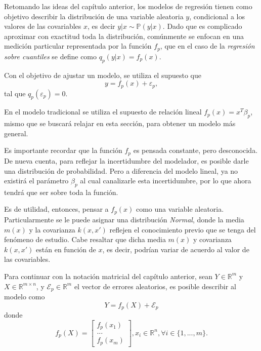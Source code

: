 Retomando las ideas del cap\'itulo anterior, los modelos de regresi\'on tienen como objetivo describir la distribuci\'on de una variable aleatoria $y$, condicional a los valores de las covariables $x$, es decir $y|x \sim \mathbb{P}(y|x)$. Dado que es complicado aproximar con exactitud toda la distribuci\'on, com\'unmente se enfocan en una medici\'on particular representada por la funci\'on $f_p$, que en el caso de la \textit{regresi\'on sobre cuantiles} se define como $q_p(y|x) = f_p(x)$.

Con el objetivo de ajustar un modelo, se utiliza el supuesto que
\begin{equation*}
    y = f_p(x) + \varepsilon_p,
\end{equation*}
tal que $q_p(\varepsilon_p)=0$. 

En el modelo tradicional se utiliza el supuesto de relaci\'on lineal $f_p(x) = x^T\beta_p$, mismo que se buscar\'a relajar en esta secci\'on, para obtener un modelo m\'as general.

Es importante recordar que la función $f_p$ es pensada constante, pero desconocida. De nueva cuenta, para reflejar la incertidumbre del modelador, es posible darle una distribución de probabilidad. Pero a diferencia del modelo lineal, ya no existir\'a el parámetro $\beta_p$ al cual canalizarle esta incertidumbre, por lo que ahora tendrá que ser sobre toda la función. 

Es de utilidad, entonces, pensar a $f_p(x)$ como una variable aleatoria. Particularmente se le puede asignar una distribución \textit{Normal}, donde la media $m(x)$ y la covarianza $k(x,x')$ reflejen el conocimiento previo que se tenga del fenómeno de estudio. Cabe resaltar que dicha media $m(x)$ y covarianza $k(x,x')$ están en función de $x$, es decir, podrían variar de acuerdo al valor de las covariables. 

Para continuar con la notación matricial del cap\'itulo anterior, sean $Y \in \mathbb{R}^m$ y $X \in \mathbb{R}^{m \times n}$, y $\mathcal{E}_p \in \mathbb{R}^m$ el vector de errores aleatorios, es posible describir al modelo como
\begin{equation*}
    Y = f_p(X) + \mathcal{E}_p
\end{equation*}
donde
\begin{equation*}
    f_p(X) =     
    \left[
        \begin{array}{c}
        f_p(x_1)  \\
        ... \\
        f_p(x_m)
        \end{array}
    \right], 
    x_i \in \mathbb{R}^n, \forall i \in \{1,...,m\}.
\end{equation*}

